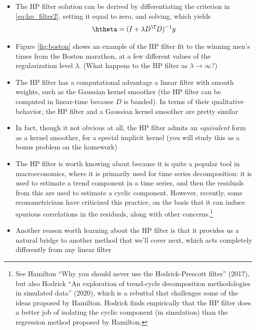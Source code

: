 \documentclass{article}
\begin{document}
\begin{itemize}
\item The HP filter solution can be derived by differentiating the criterion in
  \eqref{eq:hp_filter2}, setting it equal to zero, and solving, which yields 
  \begin{equation}
  \label{eq:theta_hp}
  \htheta = (I + \lambda D^\T D)^{-1} y
  \end{equation}

\item Figure \ref{fig:boston} shows an example of the HP filter fit to the
  winning men's times from the Boston marathon, at a few different values of the 
  regularization level $\lambda$. (What happens to the HP filter as $\lambda \to
  \infty$?)     

\item The HP filter has a computational advantage a linear filter with smooth
  weights, such as the Gaussian kernel smoother (the HP filter can be computed
  in linear-time because $D$ is banded). In terms of their qualitative behavior, 
  the HP filter and a Gaussian kernel smoother are pretty similar     

\item In fact, though it not obvious at all, the HP filter admits an
  \emph{equivalent} form as a kernel smoother, for a special implicit kernel 
  (you will study this as a bonus problem on the homework) 

\item The HP filter is worth knowing about because it is quite a popular tool in
  macroeconomics, where it is primarily used for time series decomposition: it
  is used to estimate a trend component in a time series, and then the residuals
  from this are used to estimate a cyclic component. However, recently, some 
  econometricians have criticized this practice, on the basis that it can induce
  spurious correlations in the residuals, along with other
  concerns.\footnote{See Hamilton ``Why you should never use the  
    Hodrick-Prescott filter'' (2017), but also Hodrick ``An exploration of
    trend-cycle decomposition methodologies in simulated data'' (2020), which is
    a rebuttal that challenges some of the ideas proposed by Hamilton. Hodrick
    finds empirically that the HP filter does a better job of isolating the
    cyclic component (in simulation) than the regression method proposed by 
    Hamilton.}  

\item Another reason worth learning about the HP filter is that it provides us a
  natural bridge to another method that we'll cover next, which acts completely 
  differently from any linear filter
\end{itemize}
\end{document}
